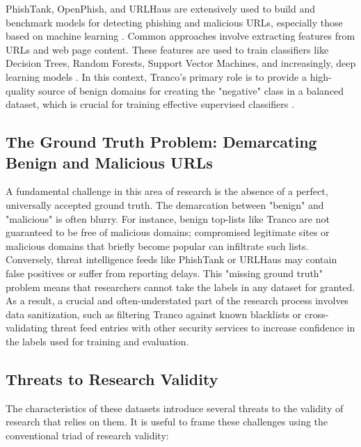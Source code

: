 \documentclass[journal,article,submit,pdftex,moreauthors]{Definitions/mdpi}
\begin{document}
PhishTank, OpenPhish, and URLHaus are extensively used to build and benchmark models for detecting phishing and malicious URLs, especially those based on machine learning \citep{ref-13,ref-14,ref-15,ref-16,ref-17,ref-18,ref-19}. Common approaches involve extracting features from URLs and web page content. These features are used to train classifiers like Decision Trees, Random Forests, Support Vector Machines, and increasingly, deep learning models \citep{ref-20,ref-21,ref-22,ref-23}. In this context, Tranco's primary role is to provide a high-quality source of benign domains for creating the "negative" class in a balanced dataset, which is crucial for training effective supervised classifiers \citep{ref-24,ref-25}.

\subsection{The Ground Truth Problem: Demarcating Benign and Malicious URLs}

A fundamental challenge in this area of research is the absence of a perfect, universally accepted ground truth. The demarcation between "benign" and "malicious" is often blurry. For instance, benign top-lists like Tranco are not guaranteed to be free of malicious domains; compromised legitimate sites or malicious domains that briefly become popular can infiltrate such lists. Conversely, threat intelligence feeds like PhishTank or URLHaus may contain false positives or suffer from reporting delays. This "missing ground truth" problem means that researchers cannot take the labels in any dataset for granted. As a result, a crucial and often-understated part of the research process involves data sanitization, such as filtering Tranco against known blacklists or cross-validating threat feed entries with other security services to increase confidence in the labels used for training and evaluation.

\subsection{Threats to Research Validity}

The characteristics of these datasets introduce several threats to the validity of research that relies on them. It is useful to frame these challenges using the conventional triad of research validity:
\end{document}
